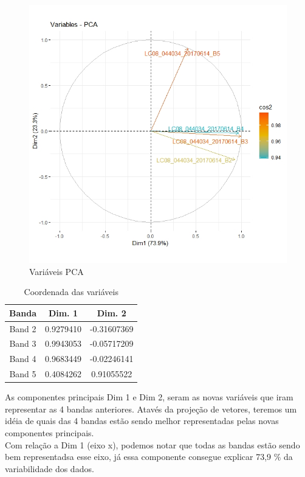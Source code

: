 \documentclass[a4paper,12pt]{article}
\begin{document}
\begin{center}
\begin{figure}[H]
    \centering
    \includegraphics[width = 0.9 \textwidth]{PCA.jpeg}
    \caption{Variáveis PCA}
\end{figure}    
\end{center}

\begin{table}[ht]
\centering
\caption{Coordenada das variáveis} \label{tab:exemplo}
\begin{tabular}{c c c}
\hline
 \textbf{Banda} & \textbf{Dim. 1} & \textbf{Dim. 2}\\
\hline 
Band 2 & 0.9279410 & -0.31607369 \\
Band 3 & 0.9943053 & -0.05717209 \\
Band 4 & 0.9683449 & -0.02246141 \\
Band 5 & 0.4084262 & 0.91055522 \\
\hline
\end{tabular}
\end{table}


As componentes principais Dim 1 e Dim 2, seram as novas variáveis que iram representar as 4 bandas anteriores. Atavés da projeção de vetores, teremos um idéia de quais das 4 bandas estão sendo melhor representadas pelas novas componentes principais.\\

Com relação a Dim 1 (eixo x), podemos notar que todas as bandas estão sendo bem representadsa esse eixo, já essa componente consegue explicar 73,9 $\%$ da variabilidade dos dados.\\
\end{document}
